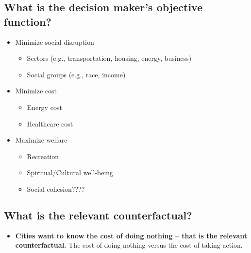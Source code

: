 \documentclass[12pt]{article}
\begin{document}
\subsection*{What is the decision maker's objective function?}
\begin{itemize}
  \item Minimize social disruption 
  \begin{itemize}
    \item Sectors (e.g., transportation, housing, energy, business)
    \item Social groups (e.g., race, income)
  \end{itemize}
  \item Minimize cost
  \begin{itemize}
    \item Energy cost
    \item Healthcare cost
  \end{itemize}
  \item Maximize welfare
  \begin{itemize}
    \item Recreation
    \item Spiritual/Cultural well-being
    \item Social cohesion????
  \end{itemize}

  
\end{itemize}
  
\subsection*{What is the relevant counterfactual?}
\begin{itemize}
  \item \textbf{Cities want to know the cost of doing nothing -- that is the relevant counterfactual.} The cost of doing nothing versus the cost of taking action.
\end{itemize}



\vfill
\noindent\begin{minipage}{\linewidth}
% 
% 
\end{minipage}
\end{document}
